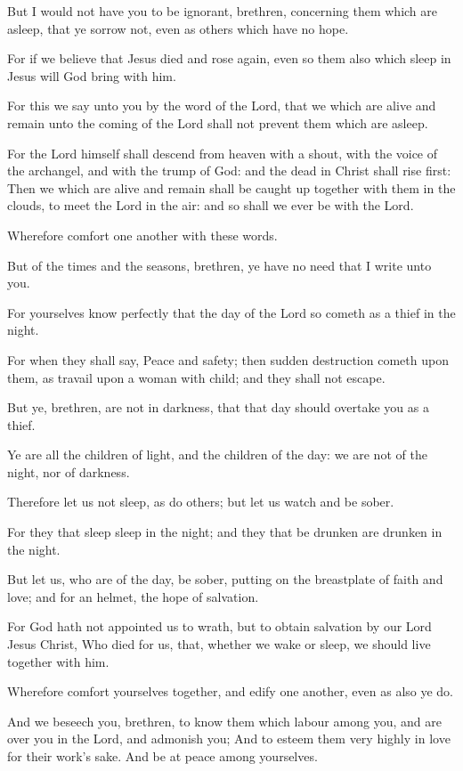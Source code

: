 \Verse But I would not have you to be ignorant, brethren, concerning them which are asleep, that ye sorrow not, even as others which have no hope.

\Verse For if we believe that Jesus died and rose again, even so them also which sleep in Jesus will God bring with him.

\Verse For this we say unto you by the word of the Lord, that we which are alive and remain unto the coming of the Lord shall not prevent them which are asleep.

\Verse For the Lord himself shall descend from heaven with a shout, with the voice of the archangel, and with the trump of God: and the dead in Christ shall rise first: \Verse Then we which are alive and remain shall be caught up together with them in the clouds, to meet the Lord in the air: and so shall we ever be with the Lord.

\Verse Wherefore comfort one another with these words.


\Chapter
\Verse But of the times and the seasons, brethren, ye have no need that I write unto you.

\Verse For yourselves know perfectly that the day of the Lord so cometh as a thief in the night.

\Verse For when they shall say, Peace and safety; then sudden destruction cometh upon them, as travail upon a woman with child; and they shall not escape.

\Verse But ye, brethren, are not in darkness, that that day should overtake you as a thief.

\Verse Ye are all the children of light, and the children of the day: we are not of the night, nor of darkness.

\Verse Therefore let us not sleep, as do others; but let us watch and be sober.

\Verse For they that sleep sleep in the night; and they that be drunken are drunken in the night.

\Verse But let us, who are of the day, be sober, putting on the breastplate of faith and love; and for an helmet, the hope of salvation.

\Verse For God hath not appointed us to wrath, but to obtain salvation by our Lord Jesus Christ, \Verse Who died for us, that, whether we wake or sleep, we should live together with him.

\Verse Wherefore comfort yourselves together, and edify one another, even as also ye do.

\Verse And we beseech you, brethren, to know them which labour among you, and are over you in the Lord, and admonish you; \Verse And to esteem them very highly in love for their work's sake. And be at peace among yourselves.

